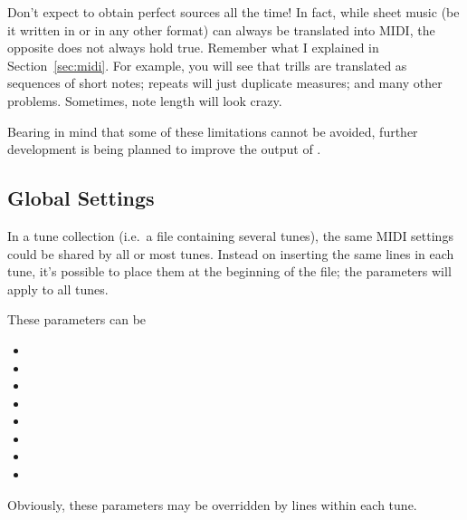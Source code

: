 \documentclass[a4paper,fullpage,12pt]{book}
\begin{document}
Don't expect to obtain perfect sources all the time! In fact, while
sheet music (be it written in \ABC{} or in any other format) can
always be translated into MIDI, the opposite does not always hold
true. Remember what I explained in Section~\ref{sec:midi}. For
example, you will see that trills are translated as sequences of short
notes; repeats will just duplicate measures; and many other problems.
Sometimes, note length will look crazy.

Bearing in mind that some of these limitations cannot be avoided, further
development is being planned to improve the output of .


\subsection{Global Settings}

In a tune collection (i.e.\ a file containing several tunes), the same MIDI
settings could be shared by all or most tunes. Instead on inserting the same
 lines in each tune, it's possible to place them at the
beginning of the file; the parameters will apply to all tunes.

These parameters can be 

\begin{itemize}

  \item {}
  \item {}
  \item {}
  \item {}
  \item {}
  \item {}
  \item {}
  \item {}
  
\end{itemize}

Obviously, these parameters may be overridden by  lines within
each tune.



\end{document}

